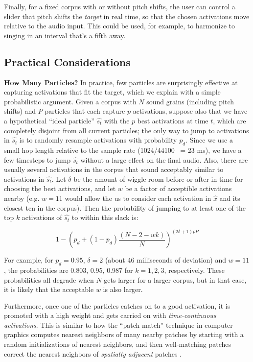 \documentclass{article}
\begin{document}
Finally, for a fixed corpus with or without pitch shifts, the user can control a slider that pitch shifts the {\em target} in real time, so that the chosen activations move relative to the audio input.  This could be used, for example, to harmonize to singing in an interval that's a fifth away.

\subsection{Practical Considerations}
\label{sec:practical}

\textbf{How Many Particles?} In practice, few particles are surprisingly effective at capturing activations that fit the target, which we explain with a simple probabilistic argument.  Given a corpus with $N$ sound grains (including pitch shifts) and $P$ particles that each capture $p$ activations, suppose also that we have a hypothetical ``ideal particle'' $\hat{s_t}$ with the $p$ best activations at time $t$, which are completely disjoint from all current particles; the only way to jump to activations in $\hat{s_t}$ is to randomly resample activations with probability $p_d$.  Since we use a small hop length relative to the sample rate (1024/44100 ~= 23 ms), we have a few timesteps to jump $\hat{s_t}$ without a large effect on the final audio.  Also, there are usually several activations in the corpus that sound acceptably similar to activations in $\hat{s_t}$.  Let $\delta$ be the amount of wiggle room before or after in time for choosing the best activations, and let $w$ be a factor of acceptible activations nearby (e.g. $w=11$ would allow the us to consider each activation in $\hat{x}$ and its closest ten in the corpus).  Then the probability of jumping to at least one of the top $k$ activations of $\hat{s_t}$ to within this slack is:

\begin{equation}
    \label{eq:timeadjacentprobmodified}
    1 - \left( p_d + (1-p_d) \frac{(N-2-wk)}{N} \right)^{(2 \delta +1)pP}
\end{equation}

For example, for $p_d = 0.95$, $\delta=2$ (about 46 milliseconds of deviation) and $w = 11$, the probabilities are 0.803, 0.95, 0.987 for $k=1, 2, 3$, respectively.  These probabilities all degrade when $N$ gets larger for a larger corpus, but in that case, it is likely that the acceptable $w$ is also larger.

Furthermore, once one of the particles catches on to a good activation, it is promoted with a high weight and gets carried on with {\em time-continuous activations}.  This is similar to how the ``patch match'' technique in computer graphics \cite{Barnes:2009:PAR, Barnes:2010:TGP} computes nearest neighbors of many nearby patches by starting with a random initializations of nearest neighbors, and then well-matching patches correct the nearest neighbors of {\em spatially adjacent} patches \cite{Barnes:2009:PAR}.
\end{document}
